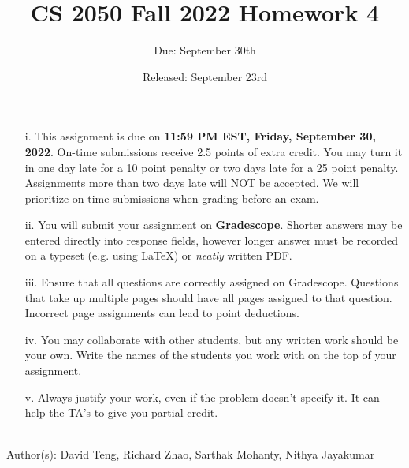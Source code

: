 \documentclass{article}
\title{CS 2050 Fall 2022 Homework 4}
\author{Due: September 30th}
\date{Released: September 23rd}
\begin{document}
\maketitle

\begin{enumerate}
    \item[i.] This assignment is due on \textbf{11:59 PM EST, Friday, September 30, 2022}.  On-time submissions receive 2.5 points of extra credit. You may turn it in one day late for a 10 point penalty or two days late for a 25 point penalty. Assignments more than two days late will NOT be accepted.  We will prioritize on-time submissions when grading before an exam.
    \item[ii.] You will submit your assignment on \textbf{Gradescope}. Shorter answers may be entered directly into response fields, however longer answer must be recorded on a typeset (e.g. using \LaTeX) or \emph{neatly} written PDF.
    \item[iii.] Ensure that all questions are correctly assigned on Gradescope. Questions that take up multiple pages should have all pages assigned to that question. Incorrect page assignments can lead to point deductions.
    \item[iv.] You may collaborate with other students, but any written work should be your own. Write the names of the students you work with on the top of your assignment.
    \item[v.] Always justify your work, even if the problem doesn't specify it. It can help the TA's to give you partial credit.
\end{enumerate}
\\

Author(s): David Teng, Richard Zhao, Sarthak Mohanty, Nithya Jayakumar

\clearpage
\end{document}

